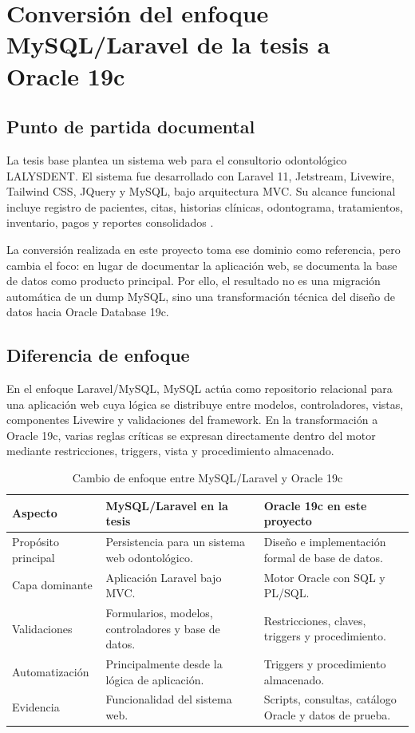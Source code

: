 \section{Conversión del enfoque MySQL/Laravel de la tesis a Oracle 19c}

\subsection{Punto de partida documental}

La tesis base plantea un sistema web para el consultorio odontológico LALYSDENT. El sistema fue desarrollado con Laravel 11, Jetstream, Livewire, Tailwind CSS, JQuery y MySQL, bajo arquitectura MVC. Su alcance funcional incluye registro de pacientes, citas, historias clínicas, odontograma, tratamientos, inventario, pagos y reportes consolidados \parencite{tesisbase,calvocobos2025web}.

La conversión realizada en este proyecto toma ese dominio como referencia, pero cambia el foco: en lugar de documentar la aplicación web, se documenta la base de datos como producto principal. Por ello, el resultado no es una migración automática de un dump MySQL, sino una transformación técnica del diseño de datos hacia Oracle Database 19c.

\subsection{Diferencia de enfoque}

En el enfoque Laravel/MySQL, MySQL actúa como repositorio relacional para una aplicación web cuya lógica se distribuye entre modelos, controladores, vistas, componentes Livewire y validaciones del framework. En la transformación a Oracle 19c, varias reglas críticas se expresan directamente dentro del motor mediante restricciones, triggers, vista y procedimiento almacenado.

\begin{table}[H]
\caption{Cambio de enfoque entre MySQL/Laravel y Oracle 19c}
\centering
\small
\begin{tabularx}{\textwidth}{L{0.25\textwidth}Y Y}
\toprule
\textbf{Aspecto} & \textbf{MySQL/Laravel en la tesis} & \textbf{Oracle 19c en este proyecto} \\
\midrule
Propósito principal & Persistencia para un sistema web odontológico. & Diseño e implementación formal de base de datos. \\
Capa dominante & Aplicación Laravel bajo MVC. & Motor Oracle con SQL y PL/SQL. \\
Validaciones & Formularios, modelos, controladores y base de datos. & Restricciones, claves, triggers y procedimiento. \\
Automatización & Principalmente desde la lógica de aplicación. & Triggers y procedimiento almacenado. \\
Evidencia & Funcionalidad del sistema web. & Scripts, consultas, catálogo Oracle y datos de prueba. \\
\bottomrule
\end{tabularx}
\end{table}


